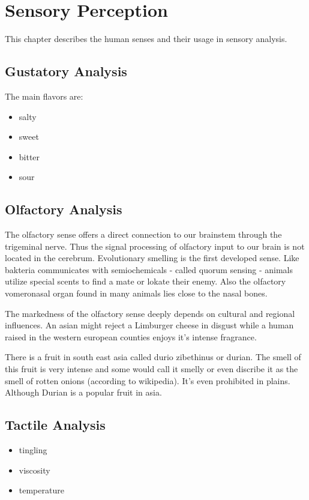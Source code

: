 \documentclass[]{scrartcl}
\begin{document}
\section{Sensory Perception}
This chapter describes the human senses and their usage in sensory analysis.
\subsection{Gustatory Analysis}
The main flavors are:
\begin{itemize}
  \item salty
  \item sweet
  \item bitter
  \item sour
\end{itemize}

\subsection{Olfactory Analysis}
The olfactory sense offers a direct connection to our brainstem through the trigeminal nerve.
Thus the signal processing of olfactory input to our brain is not located in the cerebrum.
Evolutionary smelling is the first developed sense. Like bakteria communicates with semiochemicals
- called quorum sensing - animals utilize special scents to find a mate or lokate their enemy. Also the olfactory
vomeronasal organ found in many animals lies close to the nasal bones.

The markedness of the olfactory sense deeply depends on cultural and regional influences.
An asian might reject a Limburger cheese in disgust while a human raised in the western european
counties enjoys it's intense fragrance.

There is a fruit in south east asia called durio zibethinus or durian.
The smell of this fruit is very intense and some would call it smelly or even discribe
it as the smell of rotten onions (according to wikipedia). It's even prohibited
in plains. Although Durian is a popular fruit in asia.

\subsection{Tactile Analysis}
\begin{itemize}
  \item tingling
  \item viscosity
  \item temperature
\end{itemize}
\end{document}
